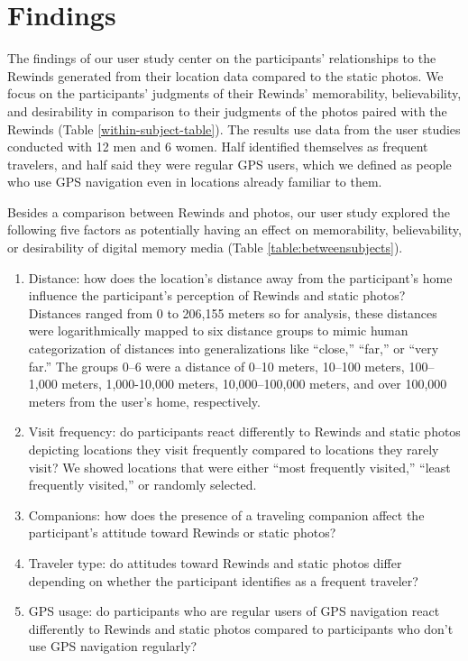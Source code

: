 \documentclass{sigchi}
\begin{document}
\section{Findings}
The findings of our user study center on the participants' relationships to the Rewinds generated from their location data compared to the static photos. We focus on the participants' judgments of their Rewinds' memorability, believability, and desirability in comparison to their judgments of the photos paired with the Rewinds (Table \ref{within-subject-table}).
The results use data from the user studies conducted with 12 men and 6 women. Half identified themselves as frequent travelers, and half said they were regular GPS users, which we defined as people who use GPS navigation even in locations already familiar to them.

Besides a comparison between Rewinds and photos, our user study explored the following five factors as potentially having an effect on memorability, believability, or desirability of digital memory media (Table \ref{table:betweensubjects}).
\begin{enumerate}
	\item Distance: how does the location's distance away from the participant's home influence the participant's perception of Rewinds and static photos? Distances ranged from 0 to 206,155 meters so for analysis, these distances were logarithmically mapped to six distance groups to mimic human categorization of distances into generalizations like ``close,'' ``far,'' or ``very far.'' The groups 0--6 were a distance of 0--10 meters, 10--100 meters, 100--1,000 meters, 1,000-10,000 meters, 10,000--100,000 meters, and over 100,000 meters from the user's home, respectively.
	\item Visit frequency: do participants react differently to Rewinds and static photos depicting locations they visit frequently compared to locations they rarely visit? We showed locations that were either ``most frequently visited,'' ``least frequently visited,'' or randomly selected.
	\item Companions: how does the presence of a traveling companion affect the participant's attitude toward Rewinds or static photos?
	\item Traveler type: do attitudes toward Rewinds and static photos differ depending on whether the participant identifies as a frequent traveler?
	\item GPS usage: do participants who are regular users of GPS navigation react differently to Rewinds and static photos compared to participants who don't use GPS navigation regularly?
\end{enumerate}
\end{document}
